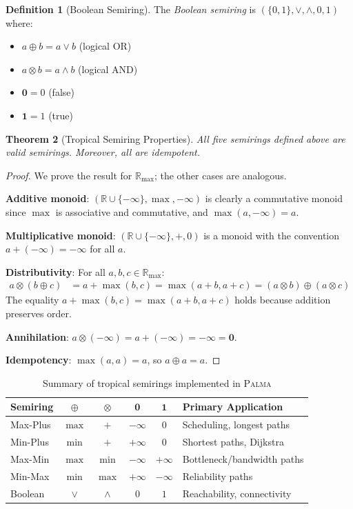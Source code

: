 \documentclass[11pt,a4paper]{article}
\theoremstyle{plain}
\newtheorem{theorem}{Theorem}[section]
\theoremstyle{definition}
\newtheorem{definition}[theorem]{Definition}
\newcommand{\palma}{\textsc{Palma}}
\newcommand{\Rmax}{\mathbb{R}_{\max}}
\begin{document}
\begin{definition}[Boolean Semiring]
\label{def:boolean}
The \emph{Boolean semiring} is $(\{0, 1\}, \vee, \wedge, 0, 1)$ where:
\begin{itemize}
    \item $a \oplus b = a \vee b$ (logical OR)
    \item $a \otimes b = a \wedge b$ (logical AND)
    \item $\mathbf{0} = 0$ (false)
    \item $\mathbf{1} = 1$ (true)
\end{itemize}
\end{definition}

\begin{theorem}[Tropical Semiring Properties]
\label{thm:tropical-properties}
All five semirings defined above are valid semirings. Moreover, all are idempotent.
\end{theorem}

\begin{proof}
We prove the result for $\Rmax$; the other cases are analogous.

\textbf{Additive monoid}: $(\mathbb{R} \cup \{-\infty\}, \max, -\infty)$ is clearly a commutative monoid since $\max$ is associative and commutative, and $\max(a, -\infty) = a$.

\textbf{Multiplicative monoid}: $(\mathbb{R} \cup \{-\infty\}, +, 0)$ is a monoid with the convention $a + (-\infty) = -\infty$ for all $a$.

\textbf{Distributivity}: For all $a, b, c \in \Rmax$:
\begin{align*}
    a \otimes (b \oplus c) &= a + \max(b, c) = \max(a + b, a + c) = (a \otimes b) \oplus (a \otimes c)
\end{align*}
The equality $a + \max(b, c) = \max(a + b, a + c)$ holds because addition preserves order.

\textbf{Annihilation}: $a \otimes (-\infty) = a + (-\infty) = -\infty = \mathbf{0}$.

\textbf{Idempotency}: $\max(a, a) = a$, so $a \oplus a = a$.
\end{proof}

\begin{table}[htbp]
\centering
\caption{Summary of tropical semirings implemented in \palma{}}
\label{tab:semirings}
\begin{tabular}{lccccl}
\toprule
\textbf{Semiring} & $\oplus$ & $\otimes$ & $\mathbf{0}$ & $\mathbf{1}$ & \textbf{Primary Application} \\
\midrule
Max-Plus & $\max$ & $+$ & $-\infty$ & $0$ & Scheduling, longest paths \\
Min-Plus & $\min$ & $+$ & $+\infty$ & $0$ & Shortest paths, Dijkstra \\
Max-Min & $\max$ & $\min$ & $-\infty$ & $+\infty$ & Bottleneck/bandwidth paths \\
Min-Max & $\min$ & $\max$ & $+\infty$ & $-\infty$ & Reliability paths \\
Boolean & $\vee$ & $\wedge$ & $0$ & $1$ & Reachability, connectivity \\
\bottomrule
\end{tabular}
\end{table}
\end{document}
